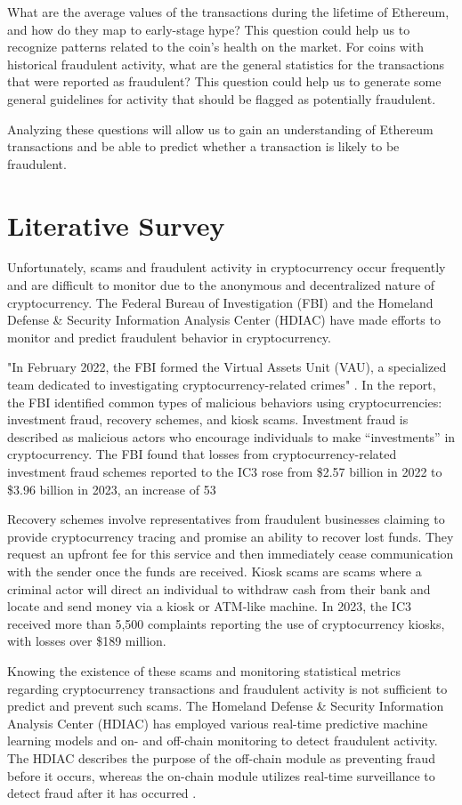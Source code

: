 \documentclass[sigconf]{acmart}
\begin{document}
What are the average values of the transactions during the lifetime of Ethereum, and how do they map to early-stage hype? This question could help us to recognize patterns related to the coin’s health on the market. For coins with historical fraudulent activity, what are the general statistics for the transactions that were reported as fraudulent? This question could help us to generate some general guidelines for activity that should be flagged as potentially fraudulent.

Analyzing these questions will allow us to gain an understanding of Ethereum transactions and be able to predict whether a transaction is likely to be fraudulent.


\section{Literative Survey}
Unfortunately, scams and fraudulent activity in cryptocurrency occur frequently and are difficult to monitor due to the anonymous and decentralized nature of cryptocurrency. The Federal Bureau of Investigation (FBI) and the Homeland Defense \& Security Information Analysis Center (HDIAC) have made efforts to monitor and predict fraudulent behavior in cryptocurrency.

"In February 2022, the FBI formed the Virtual Assets Unit (VAU), a specialized team dedicated to investigating cryptocurrency-related crimes" \cite{FBI2023}. In the report, the FBI identified common types of malicious behaviors using cryptocurrencies: investment fraud, recovery schemes, and kiosk scams. Investment fraud is described as malicious actors who encourage individuals to make “investments” in cryptocurrency. The FBI found that losses from cryptocurrency-related investment fraud schemes reported to the IC3 rose from \$2.57 billion in 2022 to \$3.96 billion in 2023, an increase of 53%

Recovery schemes involve representatives from fraudulent businesses claiming to provide cryptocurrency tracing and promise an ability to recover lost funds. They request an upfront fee for this service and then immediately cease communication with the sender once the funds are received. Kiosk scams are scams where a criminal actor will direct an individual to withdraw cash from their bank and locate and send money via a kiosk or ATM-like machine. In 2023, the IC3 received more than 5,500 complaints reporting the use of cryptocurrency kiosks, with losses over \$189 million.

Knowing the existence of these scams and monitoring statistical metrics regarding cryptocurrency transactions and fraudulent activity is not sufficient to predict and prevent such scams. The Homeland Defense \& Security Information Analysis Center (HDIAC) has employed various real-time predictive machine learning models and on- and off-chain monitoring to detect fraudulent activity. The HDIAC describes the purpose of the off-chain module as preventing fraud before it occurs, whereas the on-chain module utilizes real-time surveillance to detect fraud after it has occurred \cite{HDIAC2023}.
\end{document}
